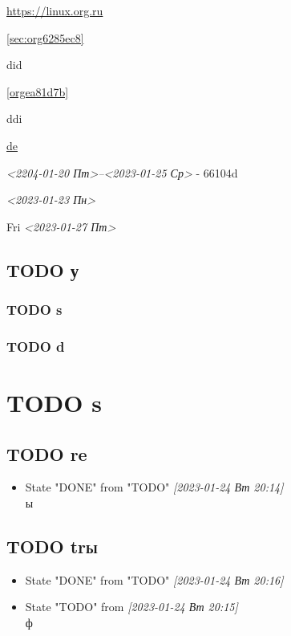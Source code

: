 \documentclass[11pt]{article}
\begin{document}
\url{https://linux.org.ru}

\ref{sec:org6285ec8}

\label{orgea81d7b}
\label{org184c045}did

\ref{orgea81d7b}

ddi

\href{https://linux.org.ru}{de}

\textit{<2204-01-20 Пт>--<2023-01-25 Ср> } - 66104d


\textit{<2023-01-23 Пн>}

Fri
\textit{<2023-01-27 Пт>}

\subsection{{\bfseries\sffamily TODO} у}
\label{sec:orgae7c586}
\subsubsection{{\bfseries\sffamily TODO} s}
\label{sec:orgb974005}
\subsubsection{{\bfseries\sffamily TODO} d}
\label{sec:orgeaae507}

\section{{\bfseries\sffamily TODO} s}
\label{sec:org2b2ae07}
\subsection{{\bfseries\sffamily TODO} re}
\label{sec:orgfbe2a8e}
\begin{itemize}
\item State "DONE"       from "TODO"       \textit{[2023-01-24 Вт 20:14] } \\
ы
\end{itemize}
\subsection{{\bfseries\sffamily TODO} tr\hfill{}\textsc{ы}}
\label{sec:org01fa7d2}
\begin{itemize}
\item State "DONE"       from "TODO"       \textit{[2023-01-24 Вт 20:16]}
\item State "TODO"       from              \textit{[2023-01-24 Вт 20:15] } \\
ф
\end{itemize}
\end{document}
